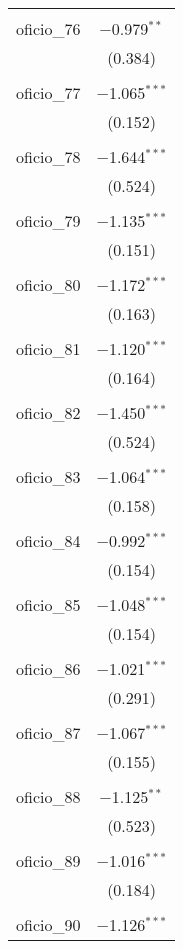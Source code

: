 \begin{table}[!htbp]
\begin{tabular}{@{\extracolsep{5pt}}lc}
  & \\ 
 oficio\_76 & $-$0.979$^{**}$ \\ 
  & (0.384) \\ 
  & \\ 
 oficio\_77 & $-$1.065$^{***}$ \\ 
  & (0.152) \\ 
  & \\ 
 oficio\_78 & $-$1.644$^{***}$ \\ 
  & (0.524) \\ 
  & \\ 
 oficio\_79 & $-$1.135$^{***}$ \\ 
  & (0.151) \\ 
  & \\ 
 oficio\_80 & $-$1.172$^{***}$ \\ 
  & (0.163) \\ 
  & \\ 
 oficio\_81 & $-$1.120$^{***}$ \\ 
  & (0.164) \\ 
  & \\ 
 oficio\_82 & $-$1.450$^{***}$ \\ 
  & (0.524) \\ 
  & \\ 
 oficio\_83 & $-$1.064$^{***}$ \\ 
  & (0.158) \\ 
  & \\ 
 oficio\_84 & $-$0.992$^{***}$ \\ 
  & (0.154) \\ 
  & \\ 
 oficio\_85 & $-$1.048$^{***}$ \\ 
  & (0.154) \\ 
  & \\ 
 oficio\_86 & $-$1.021$^{***}$ \\ 
  & (0.291) \\ 
  & \\ 
 oficio\_87 & $-$1.067$^{***}$ \\ 
  & (0.155) \\ 
  & \\ 
 oficio\_88 & $-$1.125$^{**}$ \\ 
  & (0.523) \\ 
  & \\ 
 oficio\_89 & $-$1.016$^{***}$ \\ 
  & (0.184) \\ 
  & \\ 
 oficio\_90 & $-$1.126$^{***}$ \\ 

\end{tabular}
\end{table}
